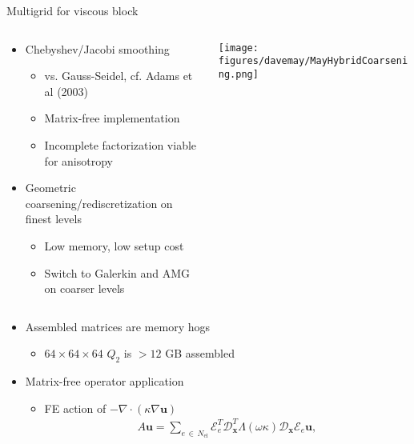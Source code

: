 \documentclass{beamer}
\begin{document}
\begin{frame}{Multigrid for viscous block}
  \begin{columns}
    \begin{column}{0.5\textwidth}
      \begin{itemize}
    \item Chebyshev/Jacobi smoothing
      \begin{itemize}
      \item vs. Gauss-Seidel, cf. Adams et al (2003)
      \item Matrix-free implementation
      \item Incomplete factorization viable for anisotropy
      \end{itemize}
    \item Geometric coarsening/rediscretization on finest levels
      \begin{itemize}
      \item Low memory, low setup cost
      \item Switch to Galerkin and AMG on coarser levels
      \end{itemize}
    \end{itemize}
  \end{column}
  \begin{column}{0.5\textwidth}
    \texttt{[image: figures/davemay/MayHybridCoarsening.png]} \\
  \end{column}
  \end{columns}
  \begin{itemize}
  \item Assembled matrices are memory hogs
    \begin{itemize}
    \item $64\times 64\times 64$ $Q_2$ is $> 12$ GB assembled
    \end{itemize}
  \item Matrix-free operator application
    \begin{itemize}
    \item FE action of $-\nabla\cdot (\kappa \nabla \mathbf u)$
      \begin{gather}\label{eq:mf-scalar}
        A \mathbf u = \sum_{e \, \in \, N_\text{el}}  \mathcal E_e^T \mathcal D_{\mathbf x}^T \Lambda(\omega \kappa) \mathcal D_{\mathbf x} \mathcal E_e \mathbf u,
      \end{gather}
    \end{itemize}
  \end{itemize}
\end{frame}
\end{document}
